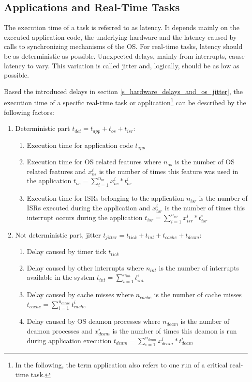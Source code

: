 \subsection{Applications and Real-Time Tasks}
The execution time of a task is referred to as latency.
It depends mainly on the executed application code, the underlying hardware and the latency caused by calls to synchronizing mechanisms of the \ac{OS}. 
For real-time tasks, latency should be as deterministic as possible.
Unexpected delays, mainly from interrupts, cause latency to vary.
This variation is called jitter and, logically, should be as low as possible. 
\par
Based the introduced delays in section \ref{s_hardware_delays_and_os_jitter}, the execution time of a specific real-time task or application\footnote{In the following, the term application also refers to one run of a critical real-time task.} can be described by the following factors:
\begin{enumerate}
	\item Deterministic part $ t_{det} = t_{app} + t_{os} + t_{isr} $: 		
		\begin{enumerate}
			\item Execution time for application code $ t_{app} $ 
			\item Execution time for \ac{OS} related features where $ n_{os} $ is the number of \ac{OS} 
						related features and $ x_{os}^{i} $ is the number of times this feature was used in the application 
						$ t_{os} = \sum\limits_{i=1}^{n_{os}} {x_{os}^{i} * t_{os}^{i}} $
			\item Execution time for \acp{ISR} belonging to the application $ n_{isr} $ is the number of 
						\acp{ISR} executed during the application and $ x_{isr}^{i} $ is the number of times this interrupt
						occurs during the application
						$ t_{isr} = \sum\limits_{i=1}^{n_{isr}} {x_{isr}^{i} * t_{isr}^{i}} $						
		\end{enumerate}	
  \item Not deterministic part, jitter $ t_{jitter} = t_{tick} + t_{int} + t_{cache} + t_{deam} $:	
		\begin{enumerate}
			\item Delay caused by timer tick $ t_{tick} $
			\item Delay caused by other interrupts where $ n_{int} $ is the number of interrupts available in the system 
						$ t_{int} = \sum\limits_{i=1}^{n_{int}} {t_{int}^{i}} $
			\item Delay caused by cache misses where $ n_{cache} $ is the number of cache misses 
						$ t_{cache} =  \sum\limits_{i=1}^{n_{cache}} {t_{cache}^{i}}$
			\item Delay caused by \ac{OS} deamon processes where $ n_{deam} $ is the number of deamon processes and
						$ x_{deam}^{i} $ is the number of times this deamon is run during application execution
						$ t_{deam} = \sum\limits_{i=1}^{n_{deam}} {x_{deam}^{i} * t_{deam}^{i}} $
		\end{enumerate}	
\end{enumerate}
 
